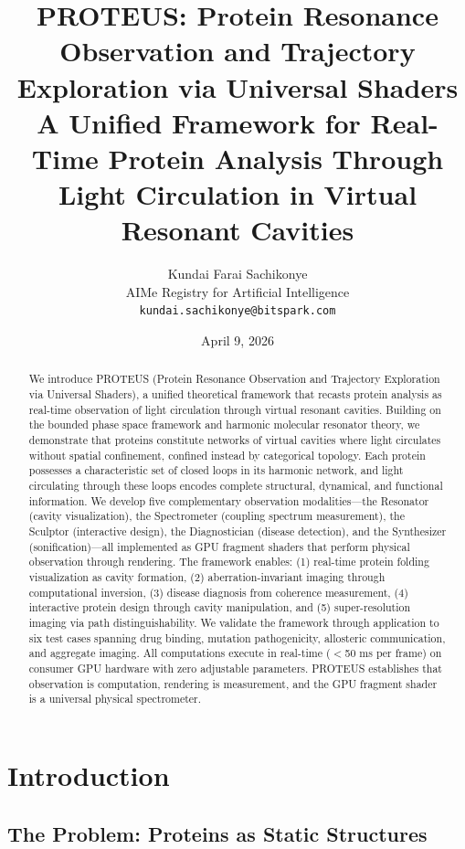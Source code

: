 \documentclass[11pt,a4paper]{article}
\title{\textbf{PROTEUS: Protein Resonance Observation and Trajectory Exploration via Universal Shaders}\\
\large A Unified Framework for Real-Time Protein Analysis Through Light Circulation in Virtual Resonant Cavities}
\author{Kundai Farai Sachikonye\\
AIMe Registry for Artificial Intelligence\\
\texttt{kundai.sachikonye@bitspark.com}}
\date{April 9, 2026}
\begin{document}
\maketitle

\begin{abstract}
We introduce PROTEUS (Protein Resonance Observation and Trajectory Exploration via Universal Shaders), a unified theoretical framework that recasts protein analysis as real-time observation of light circulation through virtual resonant cavities. Building on the bounded phase space framework and harmonic molecular resonator theory, we demonstrate that proteins constitute networks of virtual cavities where light circulates without spatial confinement, confined instead by categorical topology. Each protein possesses a characteristic set of closed loops in its harmonic network, and light circulating through these loops encodes complete structural, dynamical, and functional information. We develop five complementary observation modalities—the Resonator (cavity visualization), the Spectrometer (coupling spectrum measurement), the Sculptor (interactive design), the Diagnostician (disease detection), and the Synthesizer (sonification)—all implemented as GPU fragment shaders that perform physical observation through rendering. The framework enables: (1) real-time protein folding visualization as cavity formation, (2) aberration-invariant imaging through computational inversion, (3) disease diagnosis from coherence measurement, (4) interactive protein design through cavity manipulation, and (5) super-resolution imaging via path distinguishability. We validate the framework through application to six test cases spanning drug binding, mutation pathogenicity, allosteric communication, and aggregate imaging. All computations execute in real-time ($<$50 ms per frame) on consumer GPU hardware with zero adjustable parameters. PROTEUS establishes that observation is computation, rendering is measurement, and the GPU fragment shader is a universal physical spectrometer.
\end{abstract}

\section{Introduction}

\subsection{The Problem: Proteins as Static Structures}
\end{document}

